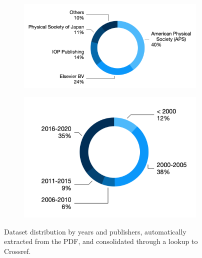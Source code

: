 \documentclass[fleqn,10pt]{wlscirep}
\begin{document}
\begin{figure}[ht]
\begin{subfigure}{0.5\textwidth}
     \centering
    \includegraphics[width=\linewidth]{papers-by-publishers.png}
    \label{fig:distribution-by-publisher}
\end{subfigure}
\begin{subfigure}{0.4\textwidth}
\centering
    \includegraphics[width=\linewidth]{papers-by-years-donut.png}
    \label{fig:distribution-by-year}
\end{subfigure}
\caption{Dataset distribution by years and publishers, automatically extracted from the PDF, and consolidated through a lookup to Crossref. }
\label{fig:dataset-distributions}
\end{figure}
\end{document}
